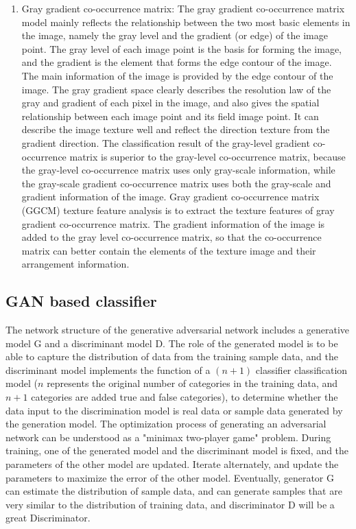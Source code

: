 \documentclass[11pt,en]{elegantpaper}
\begin{document}
\begin{enumerate}
	\item Gray gradient co-occurrence matrix: The gray gradient co-occurrence matrix model mainly reflects the relationship between the two most basic elements in the image, namely the gray level and the gradient (or edge) of the image point. The gray level of each image point is the basis for forming the image, and the gradient is the element that forms the edge contour of the image. The main information of the image is provided by the edge contour of the image. The gray gradient space clearly describes the resolution law of the gray and gradient of each pixel in the image, and also gives the spatial relationship between each image point and its field image point. It can describe the image texture well and reflect the direction texture from the gradient direction. The classification result of the gray-level gradient co-occurrence matrix is superior to the gray-level co-occurrence matrix, because the gray-level co-occurrence matrix uses only gray-scale information, while the gray-scale gradient co-occurrence matrix uses both the gray-scale and gradient information of the image. Gray gradient co-occurrence matrix (GGCM) texture feature analysis is to extract the texture features of gray gradient co-occurrence matrix. The gradient information of the image is added to the gray level co-occurrence matrix, so that the co-occurrence matrix can better contain the elements of the texture image and their arrangement information.
\end{enumerate}

\subsection{GAN based classifier}
The network structure of the generative adversarial network includes a generative model G and a discriminant model D\cite{ledig2017photo}. The role of the generated model is to be able to capture the distribution of data from the training sample data, and the discriminant model implements the function of a $(n + 1)$ classifier classification model ($n$ represents the original number of categories in the training data, and $n +1$ categories are added true and false categories), to determine whether the data input to the discrimination model is real data or sample data generated by the generation model. The optimization process of generating an adversarial network can be understood as a "minimax two-player game" problem. During training, one of the generated model and the discriminant model is fixed, and the parameters of the other model are updated. Iterate alternately, and update the parameters to maximize the error of the other model. Eventually, generator G can estimate the distribution of sample data, and can generate samples that are very similar to the distribution of training data, and discriminator D will be a great Discriminator\cite{zhao2016energy}.
\end{document}
